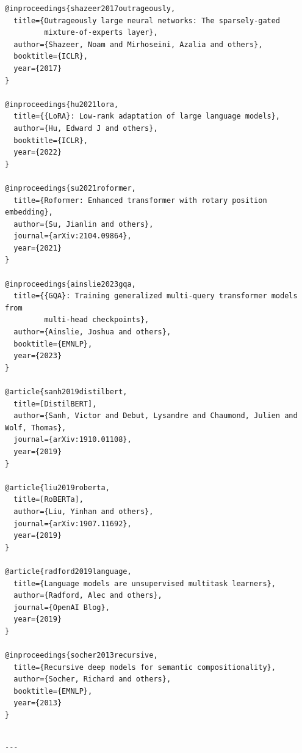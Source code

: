 \begin{lstlisting}
@inproceedings{shazeer2017outrageously,
  title={Outrageously large neural networks: The sparsely-gated 
         mixture-of-experts layer},
  author={Shazeer, Noam and Mirhoseini, Azalia and others},
  booktitle={ICLR},
  year={2017}
}

@inproceedings{hu2021lora,
  title={{LoRA}: Low-rank adaptation of large language models},
  author={Hu, Edward J and others},
  booktitle={ICLR},
  year={2022}
}

@inproceedings{su2021roformer,
  title={Roformer: Enhanced transformer with rotary position embedding},
  author={Su, Jianlin and others},
  journal={arXiv:2104.09864},
  year={2021}
}

@inproceedings{ainslie2023gqa,
  title={{GQA}: Training generalized multi-query transformer models from 
         multi-head checkpoints},
  author={Ainslie, Joshua and others},
  booktitle={EMNLP},
  year={2023}
}

@article{sanh2019distilbert,
  title=[DistilBERT],
  author={Sanh, Victor and Debut, Lysandre and Chaumond, Julien and Wolf, Thomas},
  journal={arXiv:1910.01108},
  year={2019}
}

@article{liu2019roberta,
  title=[RoBERTa],
  author={Liu, Yinhan and others},
  journal={arXiv:1907.11692},
  year={2019}
}

@article{radford2019language,
  title={Language models are unsupervised multitask learners},
  author={Radford, Alec and others},
  journal={OpenAI Blog},
  year={2019}
}

@inproceedings{socher2013recursive,
  title={Recursive deep models for semantic compositionality},
  author={Socher, Richard and others},
  booktitle={EMNLP},
  year={2013}
}
\end{lstlisting}
\begin{lstlisting}

---
\end{lstlisting}